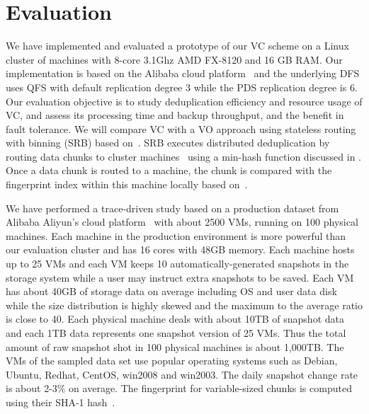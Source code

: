 \section{Evaluation}
\label{sect:evaluation}
We have implemented and evaluated a prototype of our VC scheme on a Linux cluster of machines with
8-core 3.1Ghz AMD FX-8120 and 16 GB RAM. 
Our implementation is based on the Alibaba cloud platform~\cite{Aliyun,WeiZhangIEEE}
and the underlying DFS uses  QFS with default replication degree 3 while the PDS replication degree is 6.
Our evaluation objective is to
study deduplication efficiency and resource usage of VC,  
and assess its processing time and backup throughput, and  
the benefit in fault tolerance. 
We will compare VC with a VO approach  using stateless routing with binning (SRB) 
based on~\cite{Dong2011,extreme_binning09}.
SRB executes distributed deduplication by routing data chunks to cluster machines~\cite{Dong2011}
using  a min-hash function discussed in \cite{extreme_binning09}. Once a data chunk is routed to
a machine, the chunk is compared with the fingerprint index within this machine locally based 
on~\cite{extreme_binning09}.

We have performed a trace-driven study based on a production dataset
from Alibaba Aliyun's cloud platform~\cite{Aliyun} 
with about 2500 VMs, running on 100 physical machines. 
Each machine in the production environment is more powerful than our evaluation cluster
and has 16 cores with 48GB memory.
Each machine hosts up to 25 VMs and each VM keeps 10 automatically-generated snapshots in the storage 
system while a user may instruct extra snapshots to be saved.
Each VM has about 40GB of storage  data  on average
including OS and user data disk while the size distribution is highly skewed and the maximum to
the average ratio is close to 40.
Each physical machine deals with about 10TB of snapshot data and each 1TB data represents one snapshot version
of 25 VMs.  Thus the total amount of raw snapshot shot in 100 physical machines
is about 1,000TB.
The VMs of the sampled data set use popular operating systems such as 
Debian, Ubuntu, Redhat, CentOS, win2008 and win2003. 
The daily snapshot change rate is about 2-3\% on average.
The fingerprint for variable-sized chunks is computed using their SHA-1 hash~\cite{similar94,rabin81}. 

